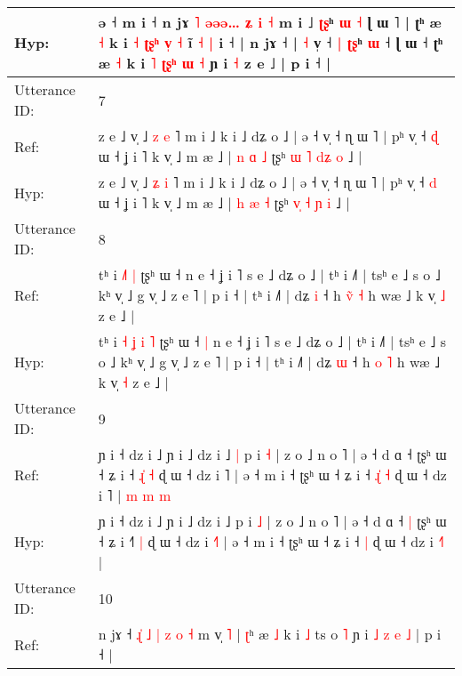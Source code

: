 \documentclass[10pt]{article}
\DeclareRobustCommand{\hl}[1]{{\textcolor{red}{#1}}}
\begin{document}
\begin{longtable}{ll}
 \\
Hyp: & ə ˧ m i ˧\hl{}\hl{} n jɤ \hl{˥} \hl{}\hl{}\hl{ə}\hl{ə}\hl{ə}\hl{…} \hl{ʑ} \hl{i} \hl{˧} m i ˩ \hl{ʈ}\hl{ʂ}ʰ \hl{}\hl{ɯ} \hl{˧} ɭ ɯ \hl{}˥ | ʈʰ æ \hl{˧} k i \hl{˧} \hl{ʈ}\hl{ʂ}\hl{ʰ}\hl{ }\hl{v}\hl{̩} \hl{˧} i\hl{}\hl{̃} \hl{˧} \hl{|} i ˧ | n jɤ ˧\hl{}\hl{}\hl{}\hl{}\hl{} | \hl{˧} v̩ ˧ \hl{}\hl{|} \hl{}\hl{ʈ}\hl{ʂ}ʰ \hl{}\hl{ɯ} ˧ ɭ ɯ ˧\hl{}\hl{} ʈʰ æ \hl{˧} k i \hl{˥} \hl{ʈ}\hl{ʂ}\hl{ʰ} \hl{ɯ} \hl{˧} ɲ i \hl{˧} z e ˩ | p i ˧ |
 \\
\midrule
Utterance ID: & 7 \\
Ref: & z e ˩ v̩ ˩ \hl{z} \hl{e} ˥ m i ˩ k i ˩ dʑ o ˩ | ə ˧ v̩ ˧ ɳ ɯ ˥ | pʰ v̩ ˧ \hl{ɖ} ɯ ˧ ʝ i ˥ k v̩ ˩ m æ ˩ | \hl{n} \hl{ɑ} \hl{˩} ʈʂʰ \hl{}\hl{ɯ} \hl{˥} \hl{d}\hl{ʑ} \hl{o} ˩ |
 \\
Hyp: & z e ˩ v̩ ˩ \hl{ʑ} \hl{i} ˥ m i ˩ k i ˩ dʑ o ˩ | ə ˧ v̩ ˧ ɳ ɯ ˥ | pʰ v̩ ˧ \hl{d} ɯ ˧ ʝ i ˥ k v̩ ˩ m æ ˩ | \hl{h} \hl{æ} \hl{˧} ʈʂʰ \hl{v}\hl{̩} \hl{˧} \hl{}\hl{ɲ} \hl{i} ˩ |
 \\
\midrule
Utterance ID: & 8 \\
Ref: & tʰ i\hl{}\hl{} \hl{}\hl{˩}\hl{˥} \hl{|} ʈʂʰ ɯ ˧\hl{}\hl{} n e ˧ ʝ i ˥ s e ˩ dʑ o ˩ | tʰ i ˩˥ | tsʰ e ˩ s o ˩ kʰ v̩ ˩ g v̩ ˩ z e ˥ | p i ˧ | tʰ i ˩˥ | dʑ \hl{i} ˧ h \hl{v}\hl{̃} \hl{˧} h wæ ˩ k v̩ \hl{˩} z e ˩ |
 \\
Hyp: & tʰ i\hl{ }\hl{˧} \hl{ʝ}\hl{ }\hl{i} \hl{˥} ʈʂʰ ɯ ˧\hl{ }\hl{|} n e ˧ ʝ i ˥ s e ˩ dʑ o ˩ | tʰ i ˩˥ | tsʰ e ˩ s o ˩ kʰ v̩ ˩ g v̩ ˩ z e ˥ | p i ˧ | tʰ i ˩˥ | dʑ \hl{ɯ} ˧ h \hl{}\hl{o} \hl{˥} h wæ ˩ k v̩ \hl{˧} z e ˩ |
 \\
\midrule
Utterance ID: & 9 \\
Ref: & ɲ i ˧ dz i ˩ ɲ i ˩ dz i ˩\hl{ }\hl{|} p i \hl{˧} | z o ˩ n o ˥ | ə ˧ d ɑ ˧\hl{}\hl{} ʈʂʰ ɯ ˧ ʑ i ˧\hl{ }\hl{ɻ}\hl{̍} \hl{˧} ɖ ɯ ˧ dz i \hl{}˥ | ə ˧ m i ˧ ʈʂʰ ɯ ˧ ʑ i ˧\hl{ }\hl{ɻ}\hl{̍} \hl{˧} ɖ ɯ ˧ dz i \hl{}˥ |\hl{ }\hl{m}\hl{ }\hl{m}\hl{ }\hl{m}
 \\
Hyp: & ɲ i ˧ dz i ˩ ɲ i ˩ dz i ˩\hl{}\hl{} p i \hl{˩} | z o ˩ n o ˥ | ə ˧ d ɑ ˧\hl{ }\hl{|} ʈʂʰ ɯ ˧ ʑ i ˧\hl{}\hl{}\hl{˥} \hl{|} ɖ ɯ ˧ dz i \hl{˧}˥ | ə ˧ m i ˧ ʈʂʰ ɯ ˧ ʑ i ˧\hl{}\hl{}\hl{} \hl{|} ɖ ɯ ˧ dz i \hl{˧}˥ |\hl{}\hl{}\hl{}\hl{}\hl{}\hl{}
 \\
\midrule
Utterance ID: & 10 \\
Ref: & n jɤ ˧\hl{ }\hl{ɻ}\hl{̍}\hl{ }\hl{˩} \hl{|} \hl{z} \hl{o} \hl{˧} m v̩ \hl{˥} | \hl{ʈ}ʰ æ \hl{˩} k i \hl{˩} ts o \hl{˥} ɲ i\hl{ }\hl{˩}\hl{ }\hl{z}\hl{ }\hl{e} \hl{˩} | p i ˧ |
 \\

\end{longtable}
\end{document}
